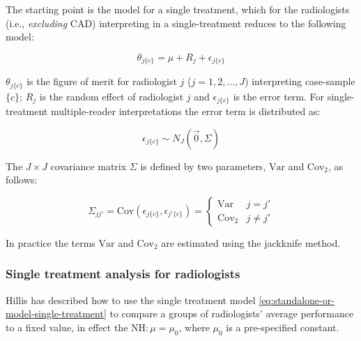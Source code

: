 \documentclass[
]{book}
\begin{document}
The starting point is the \citep{obuchowski1995hypothesis} model for a single treatment, which for the radiologists (i.e., \emph{excluding} CAD) interpreting in a single-treatment reduces to the following model:

\begin{equation}
\theta_{j\{c\}}=\mu+R_j+\epsilon_{j\{c\}}
\label{eq:standalone-or-model-single-treatment}
\end{equation}

\(\theta_{j\{c\}}\) is the figure of merit for radiologist \(j\) (\(j = 1, 2, ..., J\)) interpreting case-sample \(\{c\}\); \(R_j\) is the random effect of radiologist \(j\) and \(\epsilon_{j\{c\}}\) is the error term. For single-treatment multiple-reader interpretations the error term is distributed as:

\begin{equation}
\epsilon_{j\{c\}}\sim N_{J}\left ( \vec{0} , \Sigma \right )
\label{eq:standalone-cad-1t-eps-sampling}
\end{equation}

The \(J \times J\) covariance matrix \(\Sigma\) is defined by two parameters, \(\text{Var}\) and \(\text{Cov}_2\), as follows:

\begin{equation}
\Sigma_{jj'} = \text{Cov}\left ( \epsilon_{j\{c\}}, \epsilon_{j'\{c\}} \right )
=
\left\{\begin{matrix}
\text{Var} & j = j'\\ 
\text{Cov}_2 & j \neq j'
\end{matrix}\right.
\label{eq:standalone-cad-1t-var-cov2-sampling}
\end{equation}

In practice the terms \(\text{Var}\) and \(\text{Cov}_2\) are estimated using the jackknife method.

\hypertarget{single-treatment-analysis-for-radiologists}{%
\subsubsection{Single treatment analysis for radiologists}\label{single-treatment-analysis-for-radiologists}}

Hillis \citep{hillis2005comparison, hillis2007comparison} has described how to use the single treatment model \eqref{eq:standalone-or-model-single-treatment} to compare a groups of radiologists' average performance to a fixed value, in effect the \(\text{NH}: \mu = \mu_0\), where \(\mu_0\) is a pre-specified constant.
\end{document}
